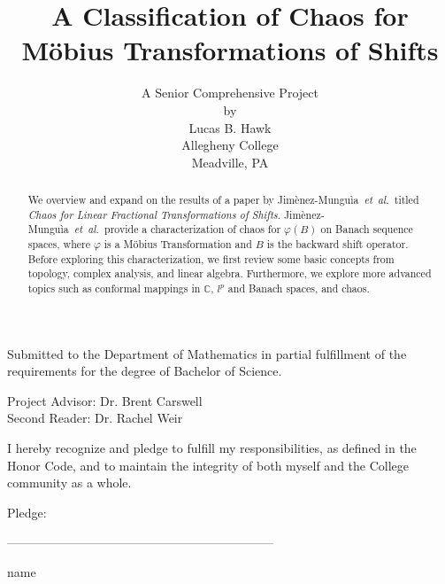 \documentclass[11pt]{article}
\title{\bf{A Classification of Chaos for M{\"o}bius} Transformations of Shifts}
\theoremstyle{plain}
\theoremstyle{definition}
\newcommand{\etal}{\mbox{\emph{et al.\ }}}
\newcommand{\authors}{Jim{\`e}nez-Mungu{\`i}a\ }
\begin{document}
\author {A Senior Comprehensive Project \\
by\\
Lucas B. Hawk \\
Allegheny College\\
Meadville, PA}

\maketitle
\thispagestyle{empty}
\begin{center}
Submitted to the Department of Mathematics in partial fulfillment of the requirements for the degree of Bachelor of Science.
\end{center}

\vspace{0.5 in}
\begin{center}
Project Advisor:  Dr. Brent Carswell \\
Second Reader: Dr. Rachel Weir
\end{center}

\vspace{0.5 in}
\begin{center}
I hereby recognize and pledge to fulfill my responsibilities, as defined in the Honor Code, and to maintain the integrity of both myself and the College community as a whole.
\end{center}

\vspace{0.25 in}
\begin{center}
Pledge:

\vspace{0.5 in}
-----------------------------------------------------------------

\vspace{0.00 in}
name
\end{center}

\doublespacing
\newpage

\thispagestyle{empty}

\begin{abstract}
We overview and expand on the results of a paper by  \authors \etal titled \textit{Chaos for Linear Fractional Transformations of Shifts}.  \authors \etal provide a characterization of chaos for $\varphi(B)$ on Banach sequence spaces, where $\varphi$ is a M{\"o}bius Transformation and $B$ is the backward shift operator.  Before exploring this characterization, we first review some basic concepts from topology, complex analysis, and linear algebra.  Furthermore, we explore more advanced topics such as conformal mappings in $\mathbb{C}$, $l^p$ and Banach spaces, and chaos.
\end{abstract}
\newpage
\thispagestyle{empty}
\tableofcontents
\end{document}
